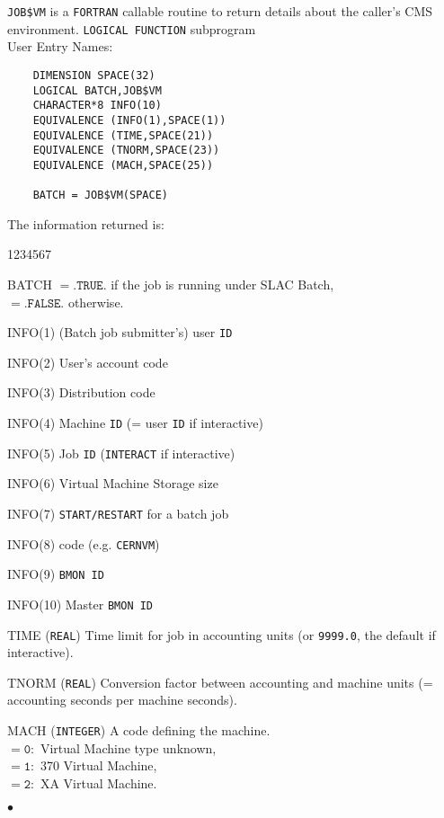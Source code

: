                      
                  
{\tt JOB\$VM} is a {\tt FORTRAN} callable routine to return details
about the caller's CMS environment.
\Structure
{\tt LOGICAL FUNCTION} subprogram\\
User Entry Names: 
\Usage
\begin{verbatim}
    DIMENSION SPACE(32)
    LOGICAL BATCH,JOB$VM
    CHARACTER*8 INFO(10)
    EQUIVALENCE (INFO(1),SPACE(1))
    EQUIVALENCE (TIME,SPACE(21))
    EQUIVALENCE (TNORM,SPACE(23))
    EQUIVALENCE (MACH,SPACE(25))
 
    BATCH = JOB$VM(SPACE)
\end{verbatim}
The information returned is:
\begin{DLtt}{1234567}
\item [BATCH] $\mathtt{= .TRUE.}$ if the job is running under SLAC Batch, \\
              $\mathtt{= .FALSE.}$ otherwise.
\item []
\item [INFO(1)] (Batch job submitter's) user {\tt ID}
\item [INFO(2)] User's account code
\item [INFO(3)] Distribution code
\item [INFO(4)] Machine {\tt ID} (= user {\tt ID} if interactive)
\item [INFO(5)] Job {\tt ID} ({\tt INTERACT} if interactive)
\item [INFO(6)] Virtual Machine Storage size
\item [INFO(7)] {\tt START/RESTART} for a batch job
\item [INFO(8)] code (e.g. {\tt CERNVM})
\item [INFO(9)] {\tt BMON ID}
\item [INFO(10)] Master {\tt BMON ID}
\item []
\item [TIME] ({\tt REAL}) Time limit for job in accounting units
(or {\tt 9999.0}, the default if interactive).
\item[TNORM] ({\tt REAL}) Conversion factor between accounting and
machine units (= accounting seconds per machine seconds).
\item [MACH] ({\tt INTEGER}) A code defining the machine. \\
$\mathtt{= 0:}$ Virtual Machine type unknown, \\
$\mathtt{= 1:}$ 370 Virtual Machine, \\
$\mathtt{= 2:}$ XA Virtual Machine.
\end{DLtt}
$\bullet$
